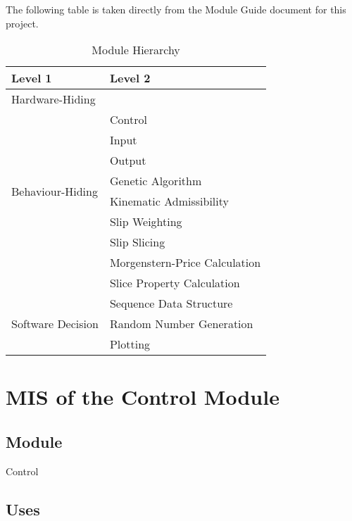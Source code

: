 \documentclass[12pt, titlepage]{article}
\begin{document}
The following table is taken directly from the Module Guide document for this 
project.

\begin{table}[h!]
	\centering
	\begin{tabular}{p{} p{} }
		\toprule
		\textbf{Level 1} & \textbf{Level 2} \\
		\midrule
		
		{Hardware-Hiding} & ~ \\
		\midrule
		
		\multirow{8}{0.3\textwidth}{Behaviour-Hiding} &
		Control \\
		& Input \\
		& Output \\
		& Genetic Algorithm \\
		& Kinematic Admissibility \\
		& Slip Weighting \\
		& Slip Slicing \\
		& Morgenstern-Price Calculation \\
		& Slice Property Calculation \\
		\midrule
		
		\multirow{3}{0.3\textwidth}{Software Decision} &
		Sequence Data Structure \\
		& Random Number Generation \\
		& Plotting \\
		\bottomrule
		
	\end{tabular}
	\caption{Module Hierarchy}
	\label{Table:Decomp}
\end{table}


\section{MIS of the Control Module}

\subsection{Module}
Control

\subsection{Uses}
\end{document}
